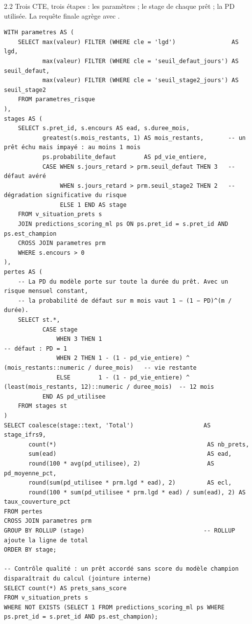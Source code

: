 \begin{correction}{2.2}
Trois CTE, trois étapes : les paramètres ; le stage de chaque prêt ; la PD utilisée. La requête finale
agrège avec .

\begin{lstlisting}[style=long]
WITH parametres AS (
    SELECT max(valeur) FILTER (WHERE cle = 'lgd')                AS lgd,
           max(valeur) FILTER (WHERE cle = 'seuil_defaut_jours') AS seuil_defaut,
           max(valeur) FILTER (WHERE cle = 'seuil_stage2_jours') AS seuil_stage2
    FROM parametres_risque
),
stages AS (
    SELECT s.pret_id, s.encours AS ead, s.duree_mois,
           greatest(s.mois_restants, 1) AS mois_restants,       -- un prêt échu mais impayé : au moins 1 mois
           ps.probabilite_defaut        AS pd_vie_entiere,
           CASE WHEN s.jours_retard > prm.seuil_defaut THEN 3   -- défaut avéré
                WHEN s.jours_retard > prm.seuil_stage2 THEN 2   -- dégradation significative du risque
                ELSE 1 END AS stage
    FROM v_situation_prets s
    JOIN predictions_scoring_ml ps ON ps.pret_id = s.pret_id AND ps.est_champion
    CROSS JOIN parametres prm
    WHERE s.encours > 0
),
pertes AS (
    -- La PD du modèle porte sur toute la durée du prêt. Avec un risque mensuel constant,
    -- la probabilité de défaut sur m mois vaut 1 − (1 − PD)^(m / durée).
    SELECT st.*,
           CASE stage
               WHEN 3 THEN 1                                                                  -- défaut : PD = 1
               WHEN 2 THEN 1 - (1 - pd_vie_entiere) ^ (mois_restants::numeric / duree_mois)   -- vie restante
               ELSE        1 - (1 - pd_vie_entiere) ^ (least(mois_restants, 12)::numeric / duree_mois)  -- 12 mois
           END AS pd_utilisee
    FROM stages st
)
SELECT coalesce(stage::text, 'Total')                    AS stage_ifrs9,
       count(*)                                           AS nb_prets,
       sum(ead)                                           AS ead,
       round(100 * avg(pd_utilisee), 2)                   AS pd_moyenne_pct,
       round(sum(pd_utilisee * prm.lgd * ead), 2)         AS ecl,
       round(100 * sum(pd_utilisee * prm.lgd * ead) / sum(ead), 2) AS taux_couverture_pct
FROM pertes
CROSS JOIN parametres prm
GROUP BY ROLLUP (stage)                                  -- ROLLUP ajoute la ligne de total
ORDER BY stage;

-- Contrôle qualité : un prêt accordé sans score du modèle champion disparaîtrait du calcul (jointure interne)
SELECT count(*) AS prets_sans_score
FROM v_situation_prets s
WHERE NOT EXISTS (SELECT 1 FROM predictions_scoring_ml ps WHERE ps.pret_id = s.pret_id AND ps.est_champion);
\end{lstlisting}


\end{correction}
